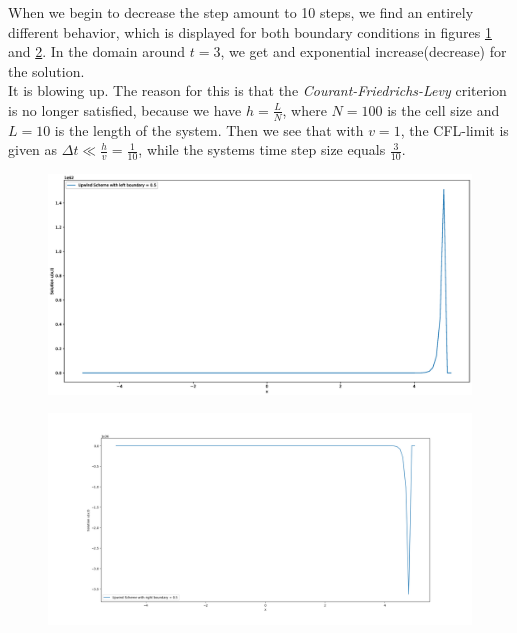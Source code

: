 \documentclass{scrartcl}
\begin{document}
When we begin to decrease the step amount to 10 steps, we find an entirely different behavior, which is displayed for both boundary conditions in figures \ref{fig:upwindblowupleft} and \ref{fig:upwindblowupright}.
In the domain around \( t = 3\), we get and exponential increase(decrease) for the solution. \\It is blowing up.
The reason for this is that the \textit{Courant-Friedrichs-Levy} criterion is no longer satisfied, because we have \( h = \frac{L}{N} \), where \( N = 100 \) is the cell size and \( L = 10 \) is the length of the system. Then we see that with \( v = 1 \), the CFL-limit is given as \( \Delta t \ll \frac{h}{v} = \frac{1}{10}\), while the systems time step size equals \( \frac{3}{10} \).


\begin{figure}[H]
	\centering
	\includegraphics[width=1\linewidth]{Plots/upwind_blowup_left}
	\caption{}
	\label{fig:upwindblowupleft}
\end{figure}

\begin{figure}[H]
	\centering
	\includegraphics[width=1\linewidth]{Plots/upwind_blowup_right}
	\caption{}
	\label{fig:upwindblowupright}
\end{figure}
\end{document}
